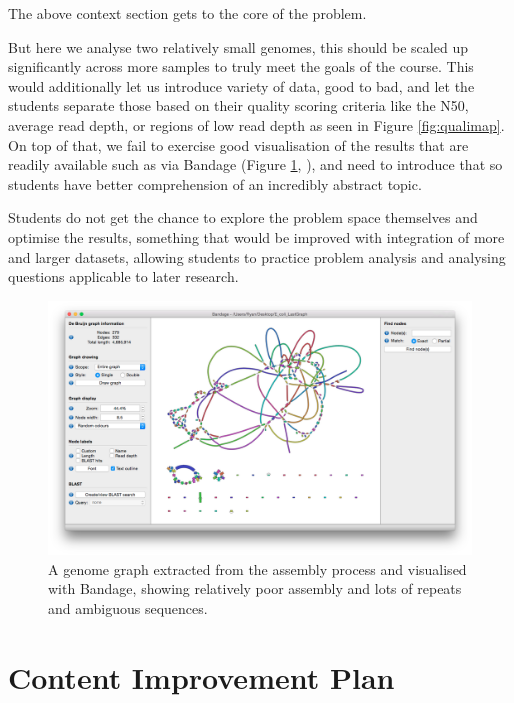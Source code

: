 \documentclass[paper=a4,justified,a4paper]{tufte-handout}
\begin{document}
The above context section gets to the core of the problem.

But here we analyse two relatively small genomes, this should be scaled
up significantly across more samples to truly meet the goals of the
course. This would additionally let us introduce variety of data, good
to bad, and let the students separate those based on their quality
scoring criteria like the N50, average read depth, or regions of low
read depth as seen in Figure \ref{fig:qualimap}. On top of that, we fail
to exercise good visualisation of the results that are readily available
such as via Bandage (Figure \ref{fig:bandage},
\citep{10.1093/bioinformatics/btv383}), and need to introduce that so
students have better comprehension of an incredibly abstract topic.

Students do not get the chance to explore the problem space themselves
and optimise the results, something that would be improved with
integration of more and larger datasets, allowing students to practice
problem analysis and analysing questions applicable to later research.

\begin{figure}
\centering
\includegraphics{./bandage_gui.png}
\caption{A genome graph extracted from the assembly process and
visualised with Bandage, showing relatively poor assembly and lots of
repeats and ambiguous sequences.\label{fig:bandage}}
\end{figure}

\hypertarget{content-improvement-plan}{%
\section{Content Improvement Plan}\label{content-improvement-plan}}
\end{document}
